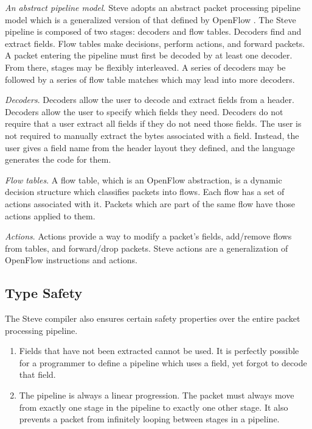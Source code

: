 \emph{An abstract pipeline model}. Steve adopts an abstract packet processing pipeline model which is a generalized version of that defined by OpenFlow \cite{openflow_spec}. The Steve pipeline is composed of two stages: decoders and flow tables. Decoders find and extract fields. Flow tables make decisions, perform actions, and forward packets. A packet entering the pipeline must first be decoded by at least one decoder. From there, stages may be flexibly interleaved. A series of decoders may be followed by a series of flow table matches which may lead into more decoders.

\emph{Decoders}. Decoders allow the user to decode and extract fields from a header. Decoders allow the user to specify which fields they need. Decoders do not require that a user extract all fields if they do not need those fields. The user is not required to manually extract the bytes associated with a field. Instead, the user gives a field name from the header layout they defined, and the language generates the code for them.

\emph{Flow tables}. A flow table, which is an OpenFlow abstraction, is a dynamic decision structure which classifies packets into flows. Each flow has a set of actions associated with it. Packets which are part of the same flow have those actions applied to them.

\emph{Actions}. Actions provide a way to modify a packet's fields, add/remove flows from tables, and forward/drop packets. Steve actions are a generalization of OpenFlow instructions and actions.

\subsection{Type Safety}


The Steve compiler also ensures certain safety properties over the entire packet processing pipeline.

\begin{enumerate}
\item Fields that have not been extracted cannot be used. It is perfectly possible for a programmer to define a pipeline which uses a field, yet forgot to decode that field.

\item The pipeline is always a linear progression. The packet must always move from exactly one stage in the pipeline to exactly one other stage. It also prevents a packet from infinitely looping between stages in a pipeline.
\end{enumerate}
